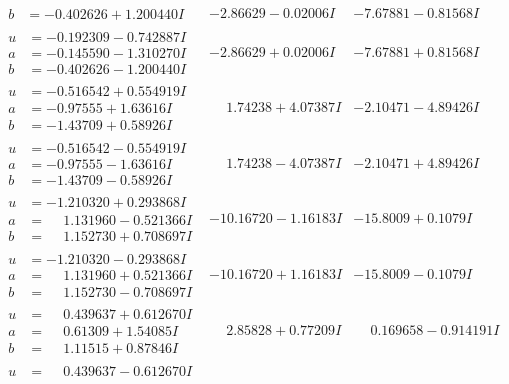 \documentclass[1p]{elsarticle_modified}
\theoremstyle{definition}
\begin{document}
$$\begin{array}{c|c|c}
\begin{aligned}
b &= -0.402626 + 1.200440 I\end{aligned}
 & -2.86629 - 0.02006 I & -7.67881 - 0.81568 I \\ \hline\begin{aligned}
u &= -0.192309 - 0.742887 I \\
a &= -0.145590 - 1.310270 I \\
b &= -0.402626 - 1.200440 I\end{aligned}
 & -2.86629 + 0.02006 I & -7.67881 + 0.81568 I \\ \hline\begin{aligned}
u &= -0.516542 + 0.554919 I \\
a &= -0.97555 + 1.63616 I \\
b &= -1.43709 + 0.58926 I\end{aligned}
 & \phantom{-}1.74238 + 4.07387 I & -2.10471 - 4.89426 I \\ \hline\begin{aligned}
u &= -0.516542 - 0.554919 I \\
a &= -0.97555 - 1.63616 I \\
b &= -1.43709 - 0.58926 I\end{aligned}
 & \phantom{-}1.74238 - 4.07387 I & -2.10471 + 4.89426 I \\ \hline\begin{aligned}
u &= -1.210320 + 0.293868 I \\
a &= \phantom{-}1.131960 - 0.521366 I \\
b &= \phantom{-}1.152730 + 0.708697 I\end{aligned}
 & -10.16720 - 1.16183 I & -15.8009 + 0.1079 I \\ \hline\begin{aligned}
u &= -1.210320 - 0.293868 I \\
a &= \phantom{-}1.131960 + 0.521366 I \\
b &= \phantom{-}1.152730 - 0.708697 I\end{aligned}
 & -10.16720 + 1.16183 I & -15.8009 - 0.1079 I \\ \hline\begin{aligned}
u &= \phantom{-}0.439637 + 0.612670 I \\
a &= \phantom{-}0.61309 + 1.54085 I \\
b &= \phantom{-}1.11515 + 0.87846 I\end{aligned}
 & \phantom{-}2.85828 + 0.77209 I & \phantom{-}0.169658 - 0.914191 I \\ \hline\begin{aligned}
u &= \phantom{-}0.439637 - 0.612670 I \\

\end{aligned}
\end{array}$$
\end{document}
